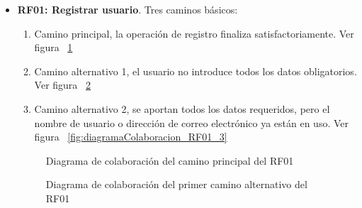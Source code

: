 \begin{itemize}
	\item \textbf{RF01: Registrar usuario}. Tres caminos básicos: 
	\begin{enumerate}
		\item Camino principal, la operación de registro finaliza satisfactoriamente. Ver figura ~\ref{fig:diagramaColaboracion_RF01_1}
		\item Camino alternativo 1, el usuario no introduce todos los datos obligatorios. Ver figura ~\ref{fig:diagramaColaboracion_RF01_2}
		\item Camino alternativo 2, se aportan todos los datos requeridos, pero el nombre de usuario o dirección de correo electrónico ya están en uso. Ver figura ~\ref{fig:diagramaColaboracion_RF01_3}
	\end{enumerate}
	\begin{figure} [!htb]
		\centering
		\caption{Diagrama de colaboración del camino principal del RF01}
		\label{fig:diagramaColaboracion_RF01_1}
	\end{figure}
	\begin{figure} [!htb]
		\centering
		\caption{Diagrama de colaboración del primer camino alternativo del RF01}
		\label{fig:diagramaColaboracion_RF01_2}
	\end{figure}
	\begin{figure} [!htb]
		\centering

\end{figure}
\end{itemize}
